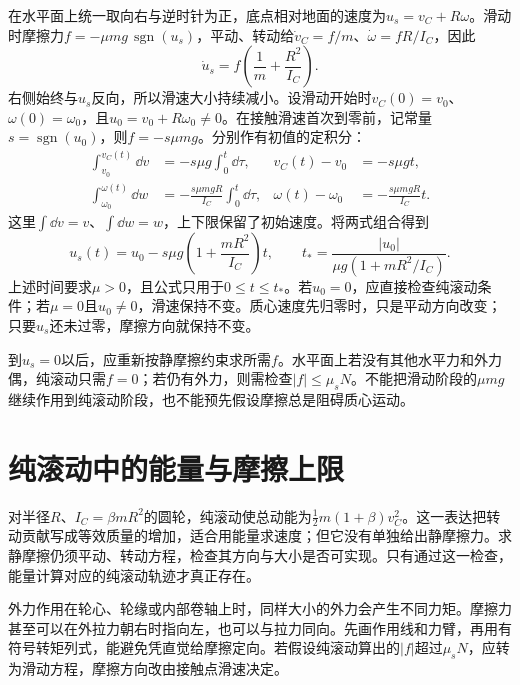 在水平面上统一取向右与逆时针为正，底点相对地面的速度为$u_s=v_C+R\omega$。滑动时摩擦力$f=-\mu mg\,\operatorname{sgn}(u_s)$，平动、转动给$\dot v_C=f/m$、$\dot\omega=fR/I_C$，因此
\[\dot u_s=f\left(\frac1m+\frac{R^2}{I_C}\right).\]
右侧始终与$u_s$反向，所以滑速大小持续减小。设滑动开始时$v_C(0)=v_0$、$\omega(0)=\omega_0$，且$u_0=v_0+R\omega_0\ne0$。在接触滑速首次到零前，记常量$s=\operatorname{sgn}(u_0)$，则$f=-s\mu mg$。分别作有初值的定积分：
\[
 \begin{aligned}
 \int_{v_0}^{v_C(t)}\dd v&=-s\mu g\int_0^t\dd\tau,
 &v_C(t)-v_0&=-s\mu gt,\\
 \int_{\omega_0}^{\omega(t)}\dd w&=-\frac{s\mu mgR}{I_C}\int_0^t\dd\tau,
 &\omega(t)-\omega_0&=-\frac{s\mu mgR}{I_C}t.
 \end{aligned}
\]
这里$\int\dd v=v$、$\int\dd w=w$，上下限保留了初始速度。将两式组合得到
\[
 u_s(t)=u_0-s\mu g\left(1+\frac{mR^2}{I_C}\right)t,
 \qquad
 t_* =\frac{|u_0|}{\mu g(1+mR^2/I_C)}.
\]
上述时间要求$\mu>0$，且公式只用于$0\le t\le t_*$。若$u_0=0$，应直接检查纯滚动条件；若$\mu=0$且$u_0\ne0$，滑速保持不变。质心速度先归零时，只是平动方向改变；只要$u_s$还未过零，摩擦方向就保持不变。

到$u_s=0$以后，应重新按静摩擦约束求所需$f$。水平面上若没有其他水平力和外力偶，纯滚动只需$f=0$；若仍有外力，则需检查$|f|\le\mu_sN$。不能把滑动阶段的$\mu mg$继续作用到纯滚动阶段，也不能预先假设摩擦总是阻碍质心运动。

\section{纯滚动中的能量与摩擦上限}

对半径$R$、$I_C=\beta mR^2$的圆轮，纯滚动使总动能为$\tfrac12m(1+\beta)v_C^2$。这一表达把转动贡献写成等效质量的增加，适合用能量求速度；但它没有单独给出静摩擦力。求静摩擦仍须平动、转动方程，检查其方向与大小是否可实现。只有通过这一检查，能量计算对应的纯滚动轨迹才真正存在。

外力作用在轮心、轮缘或内部卷轴上时，同样大小的外力会产生不同力矩。摩擦力甚至可以在外拉力朝右时指向左，也可以与拉力同向。先画作用线和力臂，再用有符号转矩列式，能避免凭直觉给摩擦定向。若假设纯滚动算出的$|f|$超过$\mu_sN$，应转为滑动方程，摩擦方向改由接触点滑速决定。

